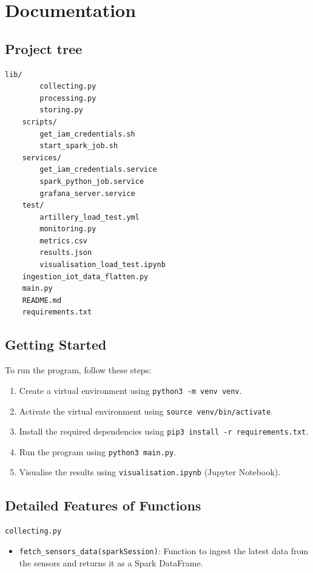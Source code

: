 \documentclass[12pt,oneside]{book} %
\begin{document}



\appendix
\chapter{Documentation}

\begin{subappendices}
    \section{Project tree}
    \begin{lstlisting}[breaklines=true, basicstyle=\small]
    lib/
        collecting.py
        processing.py
        storing.py
    scripts/
        get_iam_credentials.sh
        start_spark_job.sh
    services/
        get_iam_credentials.service
        spark_python_job.service
        grafana_server.service
    test/
        artillery_load_test.yml
        monitoring.py
        metrics.csv
        results.json
        visualisation_load_test.ipynb
    ingestion_iot_data_flatten.py
    main.py
    README.md
    requirements.txt
    \end{lstlisting}

    \section{Getting Started}
    To run the program, follow these steps:
    \begin{enumerate}
        \itemindent=17.87pt
        \item Create a virtual environment using \texttt{python3 -m venv venv}.
        \item Activate the virtual environment using \texttt{source venv/bin/activate}.
        \item Install the required dependencies using \texttt{pip3 install -r
                  requirements.txt}.
        \item Run the program using \texttt{python3 main.py}.
        \item Visualise the results using \texttt{visualisation.ipynb} (Jupyter Notebook).
    \end{enumerate}

    \section{Detailed Features of Functions}
    \begin{description}
        \item \texttt{collecting.py}
              \begin{itemize}
                  \item \texttt{fetch\_sensors\_data(sparkSession)}: Function to ingest the latest data from the sensors and returns it as a Spark DataFrame.
              \end{itemize}


\end{description}
\end{subappendices}
\end{document}
